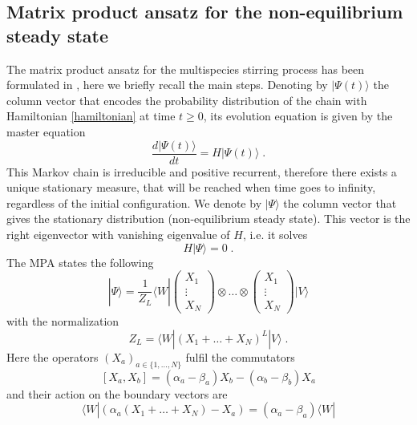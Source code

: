 \documentclass[10pt]{article}
\numberwithin{equation}{section}
\numberwithin{equation}{subsection}
\newcommand{\co}{\;,}
\newcommand{\dt}{\;.}
\begin{document}
\subsection{Matrix product ansatz for the non-equilibrium steady state}
The matrix product ansatz for the multispecies stirring process has been formulated in \cite{vanicat2017exact}, here we briefly recall the main steps.
 Denoting by $|\Psi(t)\rangle$ the column vector that encodes the probability distribution of the chain with Hamiltonian \eqref{hamiltonian} at time $t\geq 0$, its evolution equation is given by 
 the master equation
\begin{equation}
    \frac{d|{\Psi}(t)\rangle}{dt}=H|{\Psi}(t)\rangle\dt
\end{equation}
This Markov chain is irreducible and positive recurrent, therefore there exists a unique stationary measure, that will be reached when time goes to infinity, regardless of the initial configuration. 
We denote by $|\Psi\rangle$ the column vector that gives the stationary distribution (non-equilibrium steady state). This vector is the right eigenvector with vanishing eigenvalue of $H$, i.e. it solves 
\begin{equation}\label{definition-SteadyStateH}
	H|\Psi\rangle =0\dt
\end{equation}
The MPA states the following
\begin{equation}
	|\Psi\rangle=\frac{1}{Z_{L}}\langle W|\begin{pmatrix}
		X_{1}\\
		\vdots\\
		X_{N}
	\end{pmatrix}\otimes \ldots\otimes \begin{pmatrix}
		X_{1}\\
		\vdots\\
		X_{N}
	\end{pmatrix}|V\rangle
\end{equation}
with the normalization 
\begin{equation}
	Z_{L}=\langle W|(X_{1}+\ldots +X_{N})^{L}|V\rangle\dt
\end{equation}
Here the operators $(X_{a})_{a\in \{1,\ldots,N\}}$ fulfil the commutators
\begin{equation}\label{bulk}
	\left[X_{a},X_{b}\right]=(\alpha_{a}-\beta_{a})X_{b}-(\alpha_{b}-\beta_{b})X_{a}%
\end{equation}
and their action on the boundary vectors are
\begin{equation}\label{leftBoundary}
	\langle W|\left(\alpha_{a}(X_{1}+\ldots+X_{N})-X_{a}\right)=(\alpha_{a}-\beta_{a})\langle W|%
\end{equation}
\end{document}
